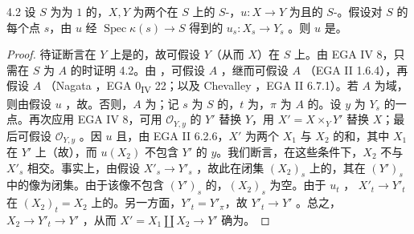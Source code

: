 \begin{SGAresult}{}{4.2}
设 $S$ 为为 $1$ 的，$X,Y$ 为两个在 $S$ 上的 $S$-，$u:X\to Y$ 为且的 $S$-。假设对 $S$ 的每个点 $s$，由 $u$ 经 $\operatorname{Spec}\kappa(s)\to S$ 得到的 $u_s:X_s\to Y_s$ 。则 $u$ 是。
\end{SGAresult}
\begin{proof}
待证断言在 $Y$ 上是的，故可假设 $Y$（从而 $X$）在 $S$ 上。由 EGA IV 8，只需在 $S$ 为 $A$ 的时证明 4.2。由 ，可假设 $A$ ，继而可假设 $A$ （EGA II 1.6.4），再假设 $A$ （Nagata ，EGA 0\textsubscript{IV} 22；以及 Chevalley ，EGA II 6.7.1）。若 $A$ 为域，则由假设 $u$ ，故。否则，$A$ 为；记 $s$ 为 $S$ 的，$t$ 为，$\pi$ 为 $A$ 的。设 $y$ 为 $Y_s$ 的一点。再次应用 EGA IV 8，可用 $\mathscr O_{Y,y}$ 的 $Y'$ 替换 $Y$，用 $X'=X\times_Y Y'$ 替换 $X$；最后可假设 $\mathscr O_{Y,y}$ 。因 $u$ 且，由 EGA II 6.2.6，$X'$ 为两个 $X_1$ 与 $X_2$ 的和，其中 $X_1$ 在 $Y'$ 上（故），而 $u(X_2)$ 不包含 $Y'$ 的 $y$。我们断言，在这些条件下，$X_2$ 不与 $X'_s$ 相交。事实上，由假设 $X'_s\to Y'_s$ ，故此在闭集 $(X_2)_s$ 上的，其在 $(Y')_s$ 中的像为闭集。由于该像不包含 $(Y')_s$ 的，$(X_2)_s$ 为空。由于 $u_t$ ， $X'_t\to Y'_t$ 在 $(X_2)_t=X_2$ 上的。另一方面，$Y'_t=Y'_\pi$，故 $Y'_t\to Y'$ 。总之， $X_2\to Y'_t\to Y'$ ，从而 $X'=X_1\amalg X_2\to Y'$ 确为。
\end{proof}
